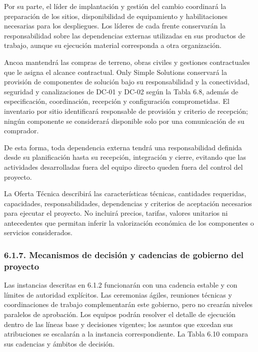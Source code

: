 \documentclass[11pt]{article}
\begin{document}
Por su parte, el líder de implantación y gestión del cambio coordinará
la preparación de los sitios, disponibilidad de equipamiento y
habilitaciones necesarias para los despliegues. Los líderes de cada
frente conservarán la responsabilidad sobre las dependencias externas
utilizadas en sus productos de trabajo, aunque su ejecución material
corresponda a otra organización.

Ancoa mantendrá las compras de terreno, obras civiles y gestiones
contractuales que le asigna el alcance contractual. Only Simple
Solutions conservará la provisión de componentes de solución bajo su
responsabilidad y la conectividad, seguridad y canalizaciones de DC-01 y DC-02 según la Tabla 6.8, además de especificación, coordinación, recepción y configuración
comprometidas. El inventario por sitio identificará responsable de
provisión y criterio de recepción; ningún componente se considerará
disponible solo por una comunicación de su comprador.

De esta forma, toda dependencia externa tendrá una responsabilidad
definida desde su planificación hasta su recepción, integración y
cierre, evitando que las actividades desarrolladas fuera del equipo
directo queden fuera del control del proyecto.

La Oferta Técnica describirá las características técnicas, cantidades
requeridas, capacidades, responsabilidades, dependencias y criterios de
aceptación necesarios para ejecutar el proyecto. No incluirá precios,
tarifas, valores unitarios ni antecedentes que permitan inferir la
valorización económica de los componentes o servicios considerados.

\subsubsection{6.1.7. Mecanismos de decisión y cadencias de gobierno del proyecto}\label{6-1-7-mecanismos-de-decision-y-cadencias-de-gobierno-del-proyecto}

Las instancias descritas en 6.1.2 funcionarán con una cadencia estable y con límites de autoridad explícitos. Las ceremonias ágiles, reuniones técnicas y coordinaciones de trabajo complementarán este gobierno, pero no crearán niveles paralelos de aprobación. Los equipos podrán resolver el detalle de ejecución dentro de las líneas base y decisiones vigentes; los asuntos que excedan sus atribuciones se escalarán a la instancia correspondiente. La Tabla 6.10 compara sus cadencias y ámbitos de decisión.
\end{document}
